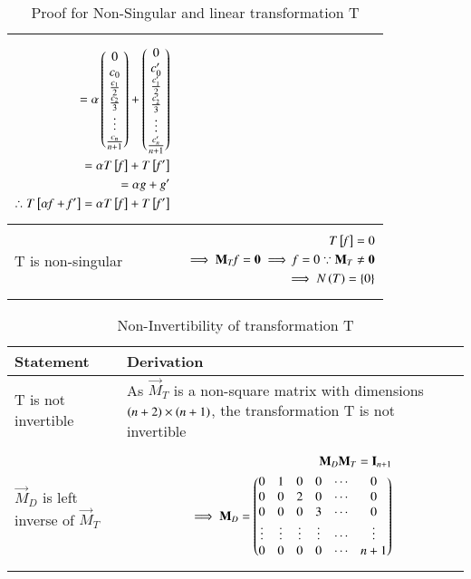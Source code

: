 \documentclass[journal,12pt,twocolumn]{IEEEtran}
\numberwithin{table}{section}
\begin{document}
\begin{table*}[ht!]
\begin{center}
\begin{tabular}{|l|l|}
{\begin{align}
=\alpha\begin{pmatrix}0\\c_0\\\frac{c_1}{2}\\\frac{c_2}{3}\\\vdots\\\frac{c_n}{n+1}\end{pmatrix}+\begin{pmatrix}0\\c_0^\prime\\\frac{c_1^\prime}{2}\\\frac{c_2^\prime}{3}\\\vdots\\\frac{c_n^\prime}{n+1}\end{pmatrix}\\
=\alpha T{}\left[\mathit{f}\right]+T{}\left[\mathit{f^\prime}\right]\\
=\alpha\mathit{g}+\mathit{g^\prime}\\
\therefore T{}\left[\alpha\mathit{f}+\mathit{f^\prime}\right]=\alpha T{}\left[\mathit{f}\right]+T{}\left[\mathit{f^\prime}\right]
\end{align}}
\\ [0.5ex] 
\hline
T is non-singular & \parbox{10cm}{\begin{align}
T{}\left[\mathit{f}\right]=0\\
\implies \mathbf{M}_T\mathit{f}=\mathbf{0}
\implies \mathit{f}=0 \because \mathbf{M}_T \ne \mathbf{0}\\
\implies N\left(T\right)=\left\{0\right\}
\end{align}}
\\ [0.5ex] 
\hline
\end{tabular}
\caption{Proof for Non-Singular and linear transformation T}
\label{table:2}
\end{center}
\vspace{-0.5cm}
\end{table*}

\renewcommand{\thetable}{3}
\begin{table*}[ht!]
\begin{center}
\begin{tabular}{|p{4.7cm}|p{10cm}|}
\hline
\textbf{Statement} & \textbf{Derivation} \\[0.5ex]
\hline
T is not invertible & As $\vec{M}_T$ is a non-square matrix with dimensions $\left(n+2\right)\times\left(n+1\right)$, the transformation T is not invertible
\\ [0.5ex] 
\hline
$\vec{M}_D$ is left inverse of $\vec{M}_T$ 
& \parbox{10cm}{\begin{align}
\mathbf{M}_D\mathbf{M}_T=\mathbf{I}_{n+1}\\
\implies \mathbf{M}_D=\begin{pmatrix}0&1&0&0&\cdots&0\\0&0&2&0&\cdots&0\\0&0&0&3&\cdots&0\\\vdots&\vdots&\vdots&\vdots&\cdots&\vdots\\0&0&0&0&\cdots&n+1\end{pmatrix}
\end{align}}
\\ [0.5ex] 
\hline
\end{tabular}
\caption{Non-Invertibility of transformation T}
\label{table:3}
\end{center}
\vspace{-0.5cm}
\end{table*}
\end{document}
